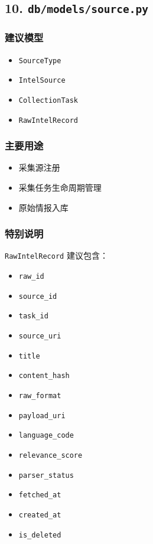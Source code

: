 \documentclass[UTF8]{ctexart}
\providecommand{\tightlist}{%
  \setlength{\itemsep}{0pt}\setlength{\parskip}{0pt}}
\begin{document}
\hypertarget{dbmodelssource.py}{%
\subsection{\texorpdfstring{10.
\texttt{db/models/source.py}}{10. db/models/source.py}}\label{dbmodelssource.py}}

\hypertarget{ux5efaux8baeux6a21ux578b}{%
\subsubsection{建议模型}\label{ux5efaux8baeux6a21ux578b}}

\begin{itemize}
\tightlist
\item
  \texttt{SourceType}
\item
  \texttt{IntelSource}
\item
  \texttt{CollectionTask}
\item
  \texttt{RawIntelRecord}
\end{itemize}

\hypertarget{ux4e3bux8981ux7528ux9014}{%
\subsubsection{主要用途}\label{ux4e3bux8981ux7528ux9014}}

\begin{itemize}
\tightlist
\item
  采集源注册
\item
  采集任务生命周期管理
\item
  原始情报入库
\end{itemize}

\hypertarget{ux7279ux522bux8bf4ux660e}{%
\subsubsection{特别说明}\label{ux7279ux522bux8bf4ux660e}}

\texttt{RawIntelRecord} 建议包含：

\begin{itemize}
\tightlist
\item
  \texttt{raw\_id}
\item
  \texttt{source\_id}
\item
  \texttt{task\_id}
\item
  \texttt{source\_uri}
\item
  \texttt{title}
\item
  \texttt{content\_hash}
\item
  \texttt{raw\_format}
\item
  \texttt{payload\_uri}
\item
  \texttt{language\_code}
\item
  \texttt{relevance\_score}
\item
  \texttt{parser\_status}
\item
  \texttt{fetched\_at}
\item
  \texttt{created\_at}
\item
  \texttt{is\_deleted}
\end{itemize}
\end{document}
